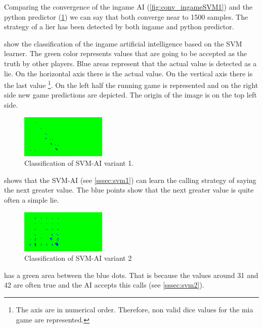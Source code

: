 \documentclass[11pt]{article}
\begin{document}
Comparing the convergence of the ingame AI (\cref{fig:conv_ingameSVM1}) and the python predictor (\cref{fig:svm1}) we can say that both converge near to 1500 samples. 
The strategy of a lier has been detected by both ingame and python predictor. 

 show the classification of the ingame artificial intelligence based on the SVM learner.
The green color represents values that are going to be accepted as the truth by other players. Blue areas represent that the actual value is detected as a lie.
On the horizontal axis there is the actual value. On the vertical axis there is the last value \footnote{The axis are in numerical order. Therefore, non valid dice values for the mia game are represented.}. 
On the left half the running game is represented and on the right side new game predictions are depicted. The origin of the image is on the top left side. 

\begin{figure}[H]
	\centering
	\includegraphics[width=.45\textwidth]{../testdata/svm1.png}
	\caption{Classification of SVM-AI variant 1.}
	\label{fig:svm1}
\end{figure}

 shows that the SVM-AI (see \cref{sssec:svm1}) can learn the calling strategy of saying the next greater value. The blue points show that the next greater value is quite often a simple lie.

\begin{figure}[H]
	\centering
	\includegraphics[width=.45\textwidth]{../testdata/svm2.png}
	\caption{Classification of SVM-AI variant 2}
	\label{fig:svm2}
\end{figure}

 has a green area between the blue dots. That is because the values around 31 and 42 are often true and the AI accepts this calls (see \cref{sssec:svm2}).
\end{document}
